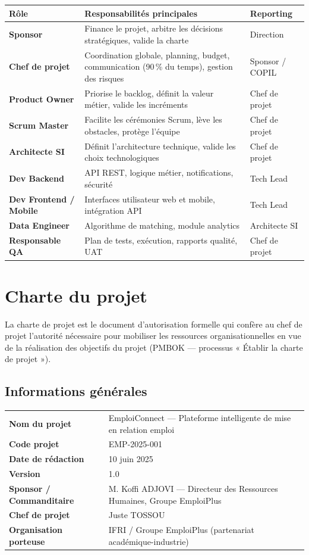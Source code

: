 \documentclass[11pt,a4paper]{article}
\newcommand{\metarow}[2]{#1 & #2 \\}
\begin{document}
\small
\begin{tabularx}{\textwidth}{|>{\bfseries}p{3cm}|X|p{3.5cm}|}
    \hline
    \rowcolor{ifrigray}
    Rôle & Responsabilités principales & Reporting \\
    \hline
    Sponsor & Finance le projet, arbitre les décisions stratégiques, valide la charte & Direction \\
    \hline
    Chef de projet & Coordination globale, planning, budget, communication (90\,\% du temps), gestion des risques & Sponsor / COPIL \\
    \hline
    Product Owner & Priorise le backlog, définit la valeur métier, valide les incréments & Chef de projet \\
    \hline
    Scrum Master & Facilite les cérémonies Scrum, lève les obstacles, protège l'équipe & Chef de projet \\
    \hline
    Architecte SI & Définit l'architecture technique, valide les choix technologiques & Chef de projet \\
    \hline
    Dev Backend & API REST, logique métier, notifications, sécurité & Tech Lead \\
    \hline
    Dev Frontend / Mobile & Interfaces utilisateur web et mobile, intégration API & Tech Lead \\
    \hline
    Data Engineer & Algorithme de matching, module analytics & Architecte SI \\
    \hline
    Responsable QA & Plan de tests, exécution, rapports qualité, UAT & Chef de projet \\
    \hline
\end{tabularx}
\normalsize

\section{Charte du projet}

La charte de projet est le document d'autorisation formelle qui confère au chef de projet l'autorité nécessaire pour mobiliser les ressources organisationnelles en vue de la réalisation des objectifs du projet (PMBOK --- processus « Établir la charte de projet »).

\subsection{Informations générales}

\noindent
\begin{tabularx}{\textwidth}{|>{\bfseries}l|X|}
    \hline
    \rowcolor{ifrigray}
    \metarow{Nom du projet}{EmploiConnect --- Plateforme intelligente de mise en relation emploi}
    \metarow{Code projet}{EMP-2025-001}
    \metarow{Date de rédaction}{10 juin 2025}
    \metarow{Version}{1.0}
    \metarow{Sponsor / Commanditaire}{M. Koffi ADJOVI --- Directeur des Ressources Humaines, Groupe EmploiPlus}
    \metarow{Chef de projet}{Juste TOSSOU}
    \metarow{Organisation porteuse}{IFRI / Groupe EmploiPlus (partenariat académique-industrie)}
    \hline
\end{tabularx}
\end{document}
